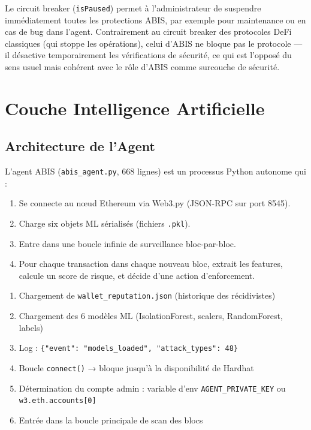 \documentclass[12pt,a4paper]{report}
\newcommand{\code}[1]{\texttt{#1}}
\begin{document}
Le circuit breaker (\code{isPaused}) permet à l'administrateur de suspendre immédiatement toutes les protections ABIS, par exemple pour maintenance ou en cas de bug dans l'agent. Contrairement au circuit breaker des protocoles DeFi classiques (qui stoppe les opérations), celui d'ABIS ne bloque pas le protocole --- il désactive temporairement les vérifications de sécurité, ce qui est l'opposé du sens usuel mais cohérent avec le rôle d'ABIS comme surcouche de sécurité.

\chapter{Couche Intelligence Artificielle}
\vspace{0pt}
\vspace{1cm}

\section{Architecture de l'Agent}

L'agent ABIS (\code{abis\_agent.py}, 668 lignes) est un processus Python autonome qui :
\begin{enumerate}
  \item Se connecte au nœud Ethereum via Web3.py (JSON-RPC sur port 8545).
  \item Charge six objets ML sérialisés (fichiers \code{.pkl}).
  \item Entre dans une boucle infinie de surveillance bloc-par-bloc.
  \item Pour chaque transaction dans chaque nouveau bloc, extrait les features, calcule un score de risque, et décide d'une action d'enforcement.
\end{enumerate}

\begin{infobox}
\begin{enumerate}
  \item Chargement de \code{wallet\_reputation.json} (historique des récidivistes)
  \item Chargement des 6 modèles ML (IsolationForest, scalers, RandomForest, labels)
  \item Log : \texttt{\{"event": "models\_loaded", "attack\_types": 48\}}
  \item Boucle \code{connect()} → bloque jusqu'à la disponibilité de Hardhat
  \item Détermination du compte admin : variable d'env \code{AGENT\_PRIVATE\_KEY} ou \code{w3.eth.accounts[0]}
  \item Entrée dans la boucle principale de scan des blocs
\end{enumerate}
\end{infobox}
\end{document}
